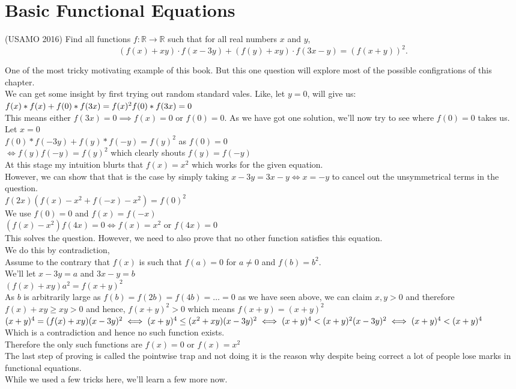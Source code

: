 \section{Basic Functional Equations}
\begin{example}
(USAMO 2016) Find all functions $f:\mathbb{R}\rightarrow \mathbb{R}$ such that for all real numbers $x$ and $y$,\[(f(x)+xy)\cdot f(x-3y)+(f(y)+xy)\cdot f(3x-y)=(f(x+y))^2.\]
\end{example}
One of the most tricky motivating example of this book. But this one question will explore most of the possible configrations of this chapter.\\
We can get some insight by first trying out random standard vales. Like, let $y=0$, will give us:\\
$f(x)*f(x)+f(0)*f(3x)=f(x)^2\\
f(0)*f(3x)=0$\\
This means either $f(3x)=0 \implies f(x)=0$ or $f(0)=0$. As we have got one solution, we'll now try to see where $f(0)=0$ takes us. Let $x=0$\\
$f(0)*f(-3y)+f(y)*f(-y)=f(y)^2$ as $f(0)=0$\\
$\iff f(y)f(-y)=f(y)^2$ which clearly shouts $f(y)=f(-y)$\\
At this stage my intuition blurts that $f(x)=x^2$ which works for the given equation.\\
However, we can show that that is the case by simply taking $x-3y=3x-y \iff x=-y$ to cancel out the unsymmetrical terms in the question.\\
$f(2x)(f(x)-x^2+f(-x)-x^2)=f(0)^2$\\
We use $f(0)=0$ and $f(x)=f(-x)$\\
$(f(x)-x^2)f(4x)=0 \iff f(x)=x^2$ or $f(4x)=0$\\
This solves the question. However, we need to also prove that no other function satisfies this equation.\\
We do this by contradiction,\\
Assume to the contrary that $f(x)$ is such that $f(a)=0$ for $a \neq 0$ and $f(b)=b^2$.\\
We'll let $x-3y=a$ and $3x-y=b$\\
$(f(x)+xy)a^2=f(x+y)^2$\\
As $b$ is arbitrarily large as $f(b)=f(2b)=f(4b)=\dots=0$ as we have seen above, we can  claim $x,y> 0$ and therefore $f(x)+xy \geq xy > 0$ and hence, $f(x+y)^2 > 0$ which means $f(x+y)=(x+y)^2$\\
$(x+y)^4=(f(x)+xy)(x-3y)^2\\
\iff (x+y)^4 \leq (x^2+xy)(x-3y)^2\\
\iff (x+y)^4 < (x+y)^2(x-3y)^2\\
\iff (x+y)^4 < (x+y)^4$\\
Which is a contradiction and hence no such function exists.\\
Therefore the only such functions are $f(x)=0$ or $f(x)=x^2$\\
The last step of proving is called the pointwise trap and not doing it is the reason why despite being correct a lot of people lose marks in functional equations.\\
While we used a few tricks here, we'll learn a few more now.
